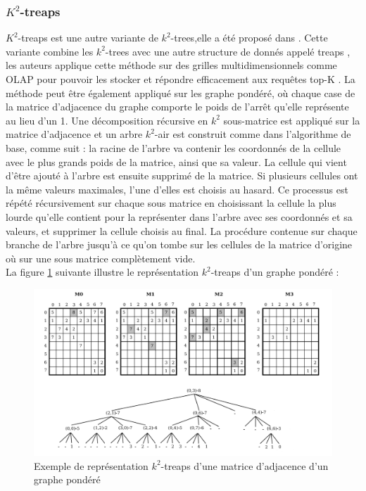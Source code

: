 \subsubsection{$K^2$-treaps }
$K^2$-treaps est une autre variante de $k^2$-trees,elle a été proposé dans \citep{brisaboa2014k}. Cette variante combine les $k^2$-trees avec une autre structure de donnés appelé treaps \citep{aragon1989randomized}, les auteurs applique cette méthode sur des grilles multidimensionnels comme OLAP pour pouvoir les stocker et répondre efficacement aux requêtes top-K \citep{badr2013traitement}. La méthode peut être également appliqué sur les graphe pondéré, où chaque case de la matrice d'adjacence du graphe comporte le poids de l'arrêt qu'elle représente au lieu d'un 1.
Une décomposition récursive en $k^2$ sous-matrice est appliqué sur la matrice d'adjacence et un arbre $k^2$-air est construit comme dans l'algorithme de base, comme suit : la racine de l'arbre va contenir les coordonnés de la cellule avec le plus grands poids de la matrice, ainsi que sa valeur. La cellule qui vient d'être ajouté à l'arbre est ensuite supprimé de la matrice. Si plusieurs cellules ont la même valeurs maximales, l'une d'elles est choisis au hasard. Ce processus est répété récursivement sur chaque sous matrice en choisissant la cellule la plus lourde qu'elle contient pour la représenter dans l'arbre avec ses coordonnés et sa valeurs, et supprimer la cellule choisis au final. La procédure contenue sur chaque branche de l'arbre jusqu'à ce qu'on tombe sur les cellules de la matrice d'origine où sur une sous matrice complètement vide.\\
La figure \ref{k2-treaps} suivante illustre le représentation $k^2$-treaps d'un graphe pondéré \citep{badr2013traitement} :

\begin{figure}[H]
\begin{center}
\includegraphics[height=200 pt, width=380 pt]{./ressources/image/k2-treaps.png} 
\end{center}
\caption{Exemple de représentation $k^2$-treaps d'une matrice d'adjacence d'un graphe pondéré}
\label{k2-treaps}
\end{figure}

